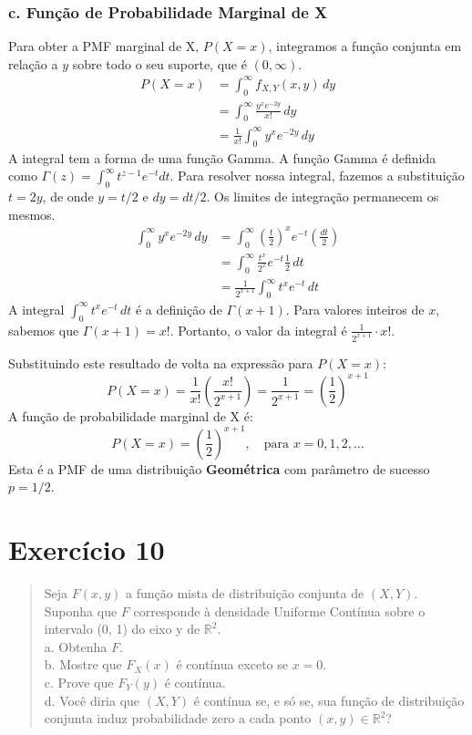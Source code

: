 \documentclass[12pt]{article}
\begin{document}
\subsubsection*{c. Função de Probabilidade Marginal de X}
Para obter a PMF marginal de X, $P(X=x)$, integramos a função conjunta em relação a $y$ sobre todo o seu suporte, que é $(0, \infty)$.
\begin{align*}
P(X=x) &= \int_{0}^{\infty} f_{X,Y}(x,y) \,dy \\
&= \int_{0}^{\infty} \frac{y^x e^{-2y}}{x!} \,dy \\
&= \frac{1}{x!} \int_{0}^{\infty} y^x e^{-2y} \,dy
\end{align*}
A integral tem a forma de uma função Gamma. A função Gamma é definida como $\Gamma(z) = \int_0^\infty t^{z-1}e^{-t}dt$.
Para resolver nossa integral, fazemos a substituição $t = 2y$, de onde $y = t/2$ e $dy = dt/2$. Os limites de integração permanecem os mesmos.
\begin{align*}
\int_{0}^{\infty} y^x e^{-2y} \,dy &= \int_{0}^{\infty} \left(\frac{t}{2}\right)^x e^{-t} \left(\frac{dt}{2}\right) \\
&= \int_{0}^{\infty} \frac{t^x}{2^x} e^{-t} \frac{1}{2} \,dt \\
&= \frac{1}{2^{x+1}} \int_{0}^{\infty} t^x e^{-t} \,dt
\end{align*}
A integral $\int_{0}^{\infty} t^x e^{-t} \,dt$ é a definição de $\Gamma(x+1)$. Para valores inteiros de $x$, sabemos que $\Gamma(x+1) = x!$.
Portanto, o valor da integral é $\frac{1}{2^{x+1}} \cdot x!$.

Substituindo este resultado de volta na expressão para $P(X=x)$:
\[ P(X=x) = \frac{1}{x!} \left( \frac{x!}{2^{x+1}} \right) = \frac{1}{2^{x+1}} = \left(\frac{1}{2}\right)^{x+1} \]
A função de probabilidade marginal de X é:
\[ P(X=x) = \left(\frac{1}{2}\right)^{x+1}, \quad \text{para } x=0, 1, 2, \dots \]
Esta é a PMF de uma distribuição \textbf{Geométrica} com parâmetro de sucesso $p=1/2$.
\hfill \qedsymbol

\section{Exercício 10}

\begin{quote}
Seja $F(x,y)$ a função mista de distribuição conjunta de $(X,Y)$. Suponha que $F$ corresponde à densidade Uniforme Contínua sobre o intervalo (0, 1) do eixo y de $\mathbb{R}^2$. \\
a. Obtenha $F$. \\
b. Mostre que $F_X(x)$ é contínua exceto se $x = 0$. \\
c. Prove que $F_Y(y)$ é contínua. \\
d. Você diria que $(X,Y)$ é contínua se, e só se, sua função de distribuição conjunta induz probabilidade zero a cada ponto $(x,y) \in \mathbb{R}^2$?
\end{quote}
\end{document}
